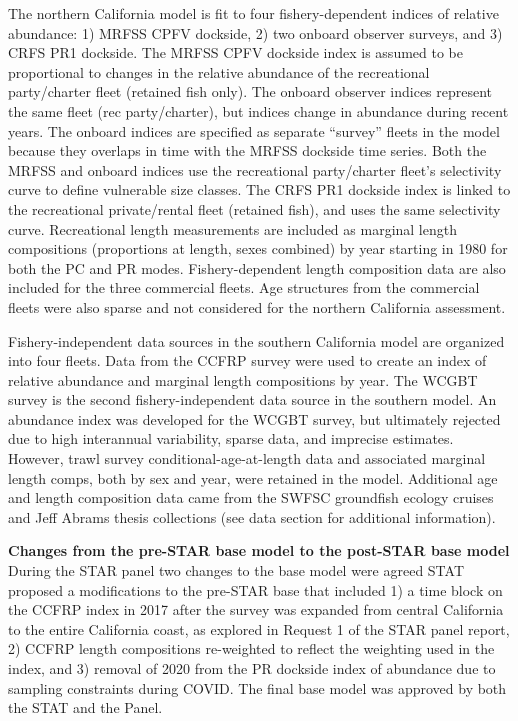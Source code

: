 \documentclass[
  english,
  a4paper,
]{article}
\begin{document}
The northern California model is fit to four fishery-dependent indices of relative abundance: 1) MRFSS CPFV dockside, 2) two onboard observer surveys, and 3) CRFS PR1 dockside. The MRFSS CPFV dockside index is assumed to be proportional to changes in the relative abundance of the recreational party/charter fleet (retained fish only). The onboard observer indices represent the same fleet (rec party/charter), but indices change in abundance during recent years. The onboard indices are specified as separate ``survey'' fleets in the model because they overlaps in time with the MRFSS dockside time series. Both the MRFSS and onboard indices use the recreational party/charter fleet's selectivity curve to define vulnerable size classes. The CRFS PR1 dockside index is linked to the recreational private/rental fleet (retained fish), and uses the same selectivity curve. Recreational length measurements are included as marginal length compositions (proportions at length, sexes combined) by year starting in 1980 for both the PC and PR modes. Fishery-dependent length composition data are also included for the three commercial fleets. Age structures from the commercial fleets were also sparse and not considered for the northern California assessment.

Fishery-independent data sources in the southern California model are organized into four fleets. Data from the CCFRP survey were used to create an index of relative abundance and marginal length compositions by year. The WCGBT survey is the second fishery-independent data source in the southern model. An abundance index was developed for the WCGBT survey, but ultimately rejected due to high interannual variability, sparse data, and imprecise estimates. However, trawl survey conditional-age-at-length data and associated marginal length comps, both by sex and year, were retained in the model. Additional age and length composition data came from the SWFSC groundfish ecology cruises and Jeff Abrams thesis collections (see data section for additional information).

\textbf{Changes from the pre-STAR base model to the post-STAR base model}
During the STAR panel two changes to the base model were agreed STAT proposed a modifications to the pre-STAR base that included 1) a time block on the CCFRP index in 2017 after the survey was expanded from central California to the entire California coast, as explored in Request 1 of the STAR panel report, 2) CCFRP length compositions re-weighted to reflect the weighting used in the index, and 3) removal of 2020 from the PR dockside index of abundance due to sampling constraints during COVID. The final base model was approved by both the STAT and the Panel.
\end{document}

